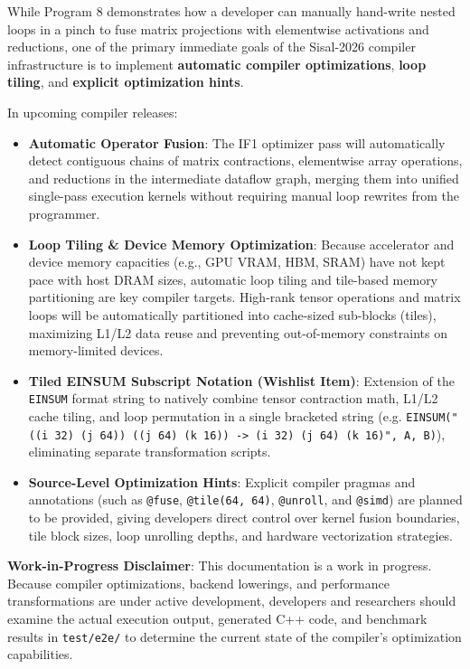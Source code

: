 \begin{note}
While Program 8 demonstrates how a developer can manually hand-write nested loops in a pinch to fuse matrix projections with elementwise activations and reductions, one of the primary immediate goals of the Sisal-2026 compiler infrastructure is to implement \textbf{automatic compiler optimizations}, \textbf{loop tiling}, and \textbf{explicit optimization hints}.

In upcoming compiler releases:
\begin{itemize}
    \item \textbf{Automatic Operator Fusion}: The IF1 optimizer pass will automatically detect contiguous chains of matrix contractions, elementwise array operations, and reductions in the intermediate dataflow graph, merging them into unified single-pass execution kernels without requiring manual loop rewrites from the programmer.
    \item \textbf{Loop Tiling \& Device Memory Optimization}: Because accelerator and device memory capacities (e.g., GPU VRAM, HBM, SRAM) have not kept pace with host DRAM sizes, automatic loop tiling and tile-based memory partitioning are key compiler targets. High-rank tensor operations and matrix loops will be automatically partitioned into cache-sized sub-blocks (tiles), maximizing L1/L2 data reuse and preventing out-of-memory constraints on memory-limited devices.
    \item \textbf{Tiled EINSUM Subscript Notation (Wishlist Item)}: Extension of the \texttt{EINSUM} format string to natively combine tensor contraction math, L1/L2 cache tiling, and loop permutation in a single bracketed string (e.g. \texttt{EINSUM("((i 32) (j 64)) ((j 64) (k 16)) -> (i 32) (j 64) (k 16)", A, B)}), eliminating separate transformation scripts.
    \item \textbf{Source-Level Optimization Hints}: Explicit compiler pragmas and annotations (such as \texttt{@fuse}, \texttt{@tile(64, 64)}, \texttt{@unroll}, and \texttt{@simd}) are planned to be provided, giving developers direct control over kernel fusion boundaries, tile block sizes, loop unrolling depths, and hardware vectorization strategies.
\end{itemize}

\textbf{Work-in-Progress Disclaimer}: This documentation is a work in progress. Because compiler optimizations, backend lowerings, and performance transformations are under active development, developers and researchers should examine the actual execution output, generated C++ code, and benchmark results in \texttt{test/e2e/} to determine the current state of the compiler's optimization capabilities.
\end{note}

